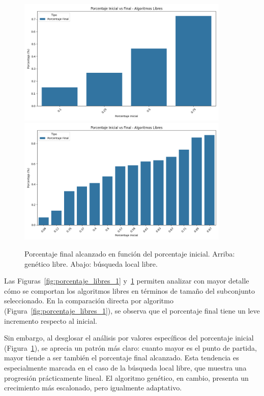 \begin{figure}[htp]
    \centering
    \includegraphics[width=0.9\textwidth]{imagenes/evaluaciones/libres/porcentaje-inicial-vs-final-por-pi_gev_v2.png}
    \vspace{1em}
    \includegraphics[width=0.9\textwidth]{imagenes/evaluaciones/libres/porcentaje-inicial-vs-final-por-pi_bl.png}
    \caption{Porcentaje final alcanzado en función del porcentaje inicial.
        Arriba: genético libre.
        Abajo: búsqueda local libre.
    }
    \label{fig:porcentaje_libres_2}
\end{figure}

Las Figuras~\ref{fig:porcentaje_libres_1} y~\ref{fig:porcentaje_libres_2} permiten analizar con mayor detalle cómo se comportan
los algoritmos libres en términos de tamaño del subconjunto seleccionado.
En la comparación directa por algoritmo (Figura~\ref{fig:porcentaje_libres_1}), se observa que el porcentaje final tiene un leve incremento respecto al inicial.

Sin embargo, al desglosar el análisis por valores específicos del porcentaje inicial (Figura~\ref{fig:porcentaje_libres_2}),
se aprecia un patrón más claro: cuanto mayor es el punto de partida, mayor tiende a ser también el porcentaje final alcanzado.
Esta tendencia es especialmente marcada en el caso de la búsqueda local libre, que muestra una progresión prácticamente lineal.
El algoritmo genético, en cambio, presenta un crecimiento más escalonado, pero igualmente adaptativo.

